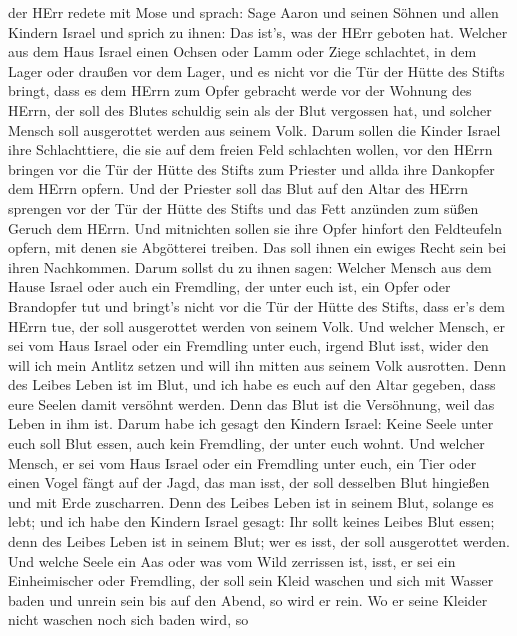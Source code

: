 der HErr redete mit Mose und sprach:  Sage Aaron und seinen
Söhnen und allen Kindern Israel und sprich zu ihnen: Das ist's, was der
HErr geboten hat.  Welcher aus dem Haus Israel einen Ochsen
oder Lamm oder Ziege schlachtet, in dem Lager oder draußen vor dem
Lager,  und es nicht vor die Tür der Hütte des Stifts
bringt, dass es dem HErrn zum Opfer gebracht werde vor der Wohnung des
HErrn, der soll des Blutes schuldig sein als der Blut vergossen hat, und
solcher Mensch soll ausgerottet werden aus seinem Volk. 
Darum sollen die Kinder Israel ihre Schlachttiere, die sie auf dem
freien Feld schlachten wollen, vor den HErrn bringen vor die Tür der
Hütte des Stifts zum Priester und allda ihre Dankopfer dem HErrn opfern.
 Und der Priester soll das Blut auf den Altar des HErrn
sprengen vor der Tür der Hütte des Stifts und das Fett anzünden zum
süßen Geruch dem HErrn.  Und mitnichten sollen sie ihre
Opfer hinfort den Feldteufeln opfern, mit denen sie Abgötterei treiben.
Das soll ihnen ein ewiges Recht sein bei ihren Nachkommen. 
Darum sollst du zu ihnen sagen: Welcher Mensch aus dem Hause Israel oder
auch ein Fremdling, der unter euch ist, ein Opfer oder Brandopfer tut
 und bringt's nicht vor die Tür der Hütte des Stifts, dass
er's dem HErrn tue, der soll ausgerottet werden von seinem Volk.
 Und welcher Mensch, er sei vom Haus Israel oder ein
Fremdling unter euch, irgend Blut isst, wider den will ich mein Antlitz
setzen und will ihn mitten aus seinem Volk ausrotten.  Denn
des Leibes Leben ist im Blut, und ich habe es euch auf den Altar
gegeben, dass eure Seelen damit versöhnt werden. Denn das Blut ist die
Versöhnung, weil das Leben in ihm ist.  Darum habe ich
gesagt den Kindern Israel: Keine Seele unter euch soll Blut essen, auch
kein Fremdling, der unter euch wohnt.  Und welcher Mensch,
er sei vom Haus Israel oder ein Fremdling unter euch, ein Tier oder
einen Vogel fängt auf der Jagd, das man isst, der soll desselben Blut
hingießen und mit Erde zuscharren.  Denn des Leibes Leben
ist in seinem Blut, solange es lebt; und ich habe den Kindern Israel
gesagt: Ihr sollt keines Leibes Blut essen; denn des Leibes Leben ist in
seinem Blut; wer es isst, der soll ausgerottet werden.  Und
welche Seele ein Aas oder was vom Wild zerrissen ist, isst, er sei ein
Einheimischer oder Fremdling, der soll sein Kleid waschen und sich mit
Wasser baden und unrein sein bis auf den Abend, so wird er rein.
 Wo er seine Kleider nicht waschen noch sich baden wird, so
